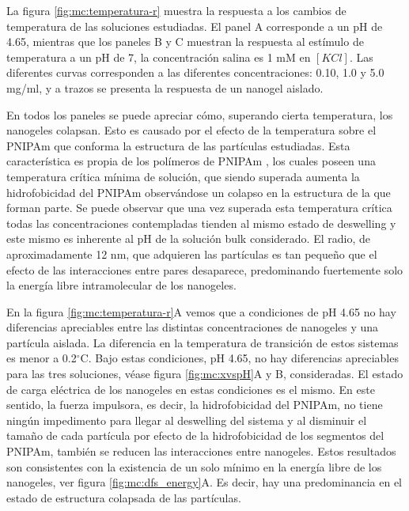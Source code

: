 	La figura \ref{fig:mc:temperatura-r} muestra la respuesta a los cambios de temperatura de las soluciones estudiadas. El panel A corresponde a un pH de 4.65, mientras que los paneles B y C muestran la respuesta al est\'imulo de temperatura a un pH de 7, la concentraci\'on salina es 1 mM en $[KCl]$. Las diferentes curvas corresponden a las diferentes concentraciones: 0.10, 1.0 y 5.0 mg/ml, y a trazos se presenta la respuesta de un nanogel aislado.
	
	En todos los paneles se puede apreciar c\'omo, superando cierta temperatura, los nanogeles colapsan. Esto es causado por el efecto de la temperatura sobre el PNIPAm que conforma la estructura de las part\'iculas estudiadas. Esta caracter\'istica es propia de los pol\'imeros de PNIPAm \cite{perez2021thermodynamic}, los cuales poseen una temperatura cr\'itica m\'inima de soluci\'on, que siendo superada aumenta la hidrofobicidad del PNIPAm observ\'andose un colapso en la estructura de la que forman parte. Se puede observar que una vez superada esta temperatura cr\'itica todas las concentraciones contempladas tienden al mismo estado de deswelling y este mismo es inherente al pH de la soluci\'on bulk considerado. El radio, de aproximadamente 12 nm, que adquieren las part\'iculas es tan peque\~no que el efecto de las interacciones entre pares desaparece, predominando fuertemente solo la energ\'ia libre intramolecular de los nanogeles.
	
	En la figura \ref{fig:mc:temperatura-r}A vemos que a condiciones de pH 4.65 no hay diferencias apreciables entre las distintas concentraciones de nanogeles y una part\'icula aislada. La diferencia en la temperatura de transici\'on de estos sistemas es menor a 0.2$^\circ$C. Bajo estas condiciones, pH 4.65, no hay diferencias apreciables para las tres soluciones, v\'ease figura \ref{fig:mc:xvspH}A y B, consideradas. El estado de carga el\'ectrica de los nanogeles en estas condiciones es el mismo. En este sentido, la fuerza impulsora, es decir, la hidrofobicidad del PNIPAm, no tiene ning\'un impedimento para llegar al deswelling del sistema y al disminuir el tama\~no de cada part\'icula por efecto de la hidrofobicidad de los segmentos del PNIPAm, tambi\'en se reducen las interacciones entre nanogeles. Estos resultados son consistentes con la existencia de un solo m\'inimo en la energ\'ia libre de los nanogeles, ver figura \ref{fig:mc:dfs_energy}A. Es decir, hay una predominancia en el estado de estructura colapsada de las part\'iculas.
	
